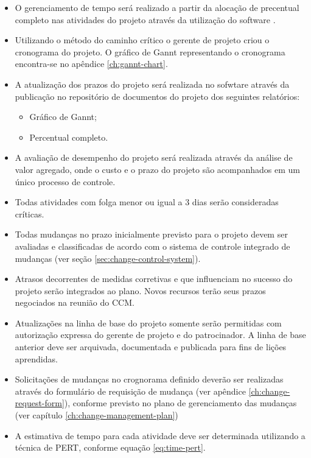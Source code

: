 \begin{itemize}
	\item O gerenciamento de tempo será realizado a partir da alocação de precentual completo nas atividades do projeto através da utilização do software \projectManagementSoftwareName{}.
	\item Utilizando o método do caminho crítico o gerente de projeto criou o cronograma do projeto. O gráfico de Gannt representando o cronograma encontra-se no apêndice \ref{ch:gannt-chart}.
	\item A atualização dos prazos do projeto será realizada no sofwtare \projectManagementSoftwareName{} através da publicação no repositório de documentos do projeto dos seguintes relatórios:
	      \begin{itemize}
		      \item Gráfico de Gannt;
		      \item Percentual completo.
	      \end{itemize}
	\item A avaliação de desempenho do projeto será realizada através da análise de valor agregado, onde o custo e o prazo do projeto são acompanhados em um único processo de controle.
	\item Todas atividades com folga menor ou igual a 3 dias serão consideradas críticas.
	\item Todas mudanças no prazo inicialmente previsto para o projeto devem ser avaliadas e classificadas de acordo com o sistema de controle integrado de mudanças (ver seção \ref{sec:change-control-system}).
	\item Atrasos decorrentes de medidas corretivas e que influenciam no sucesso do projeto serão integrados ao plano. Novos recursos terão seus prazos negociados na reunião do CCM.
	\item Atualizações na linha de base do projeto somente serão permitidas com autorização expressa do gerente de projeto e do patrocinador. A linha de base anterior deve ser arquivada, documentada e publicada para fins de lições aprendidas.
	\item Solicitações de mudanças no crognorama definido deverão ser realizadas através do formulário de requisição de mudança (ver apêndice \ref{ch:change-request-form}), conforme previsto no plano de gerenciamento das mudanças (ver capítulo \ref{ch:change-management-plan})
	\item A estimativa de tempo para cada atividade deve ser determinada utilizando a técnica de PERT, conforme equação \ref{eq:time-pert}.


\end{itemize}
